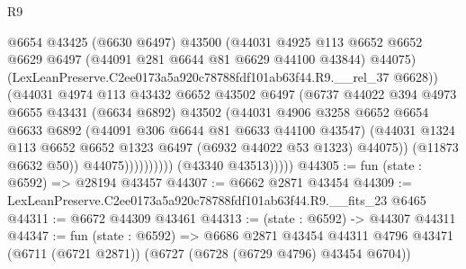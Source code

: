 \begin{lexlean}{R9}
\begin{coremodule}
                                @6654
                                @43425
                                (@6630 @6497)
                                @43500
                                (@44031
                                  @4925
                                  @113
                                  @6652
                                  @6652
                                  @6629
                                  @6497
                                  (@44091 @281 @6644 @81 @6629 @44100 @43844)
                                  @44075)
                                (LexLeanPreserve.C2ee0173a5a920c78788fdf101ab63f44.R9.__rel_37
                                  @6628))
                              (@44031
                                @4974
                                @113
                                @43432
                                @6652
                                @43502
                                @6497
                                (@6737
                                  @44022
                                  @394
                                  @4973
                                  @6655
                                  @43431
                                  (@6634 @6892)
                                  @43502
                                  (@44031
                                    @4906
                                    @3258
                                    @6652
                                    @6654
                                    @6633
                                    @6892
                                    (@44091 @306 @6644 @81 @6633 @44100 @43547)
                                    (@44031
                                      @1324
                                      @113
                                      @6652
                                      @6652
                                      @1323
                                      @6497
                                      (@6932 @44022 @53 @1323)
                                      @44075))
                                  (@11873 @6632 @50))
                                @44075))))))))))
            (@43340 @43513)))))
@44305 := fun (state : @6592) => @28194 @43457
@44307 := @6662 @2871 @43454
@44309 := LexLeanPreserve.C2ee0173a5a920c78788fdf101ab63f44.R9.__fits_23 @6465
@44311 := @6672 @44309 @43461
@44313 := (state : @6592) -> @44307 @44311
@44347 := fun (state : @6592) =>
  @6686
    @2871
    @43454
    @44311
    @4796
    @43471
    (@6711 (@6721 @2871))
    (@6727 (@6728 (@6729 @4796) @43454 @6704))

\end{coremodule}
\end{lexlean}

